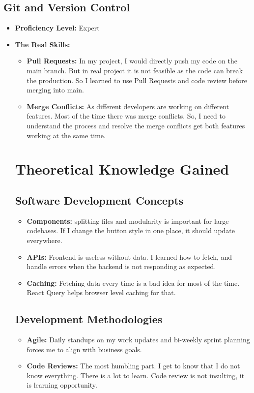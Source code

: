 \subsection{Git and Version Control}
\begin{itemize}
    \item \textbf{Proficiency Level:}  Expert
    \item \textbf{The Real Skills:}
    \begin{itemize}
        \item \textbf{Pull Requests:} In my project, I would directly push my code on the main branch. But in real project it is not feasible as the code can break the production. So I learned to use Pull Requests and code review before merging into main.
        \item \textbf{Merge Conflicts:} As different developers are working on different features. Most of the time there was merge conflicts. So, I need to understand the process and resolve the merge conflicts get both features working at the same time.
\end{itemize}


\section{Theoretical Knowledge Gained}

\subsection{Software Development Concepts}
\begin{itemize}
    \item \textbf{Components:} splitting files and modularity is important for large codebases. If I change the button style in one place, it should update everywhere.
    \item \textbf{APIs:} Frontend is useless without data. I learned how to fetch, and handle errors when the backend is not responding as expected.
    \item \textbf{Caching:} Fetching data every time is a bad idea for most of the time. React Query helps browser level caching for that.
\end{itemize}

\subsection{Development Methodologies}
\begin{itemize}
    \item \textbf{Agile:} Daily standups on my work updates and bi-weekly sprint planning forces me to align with business goals.
    \item \textbf{Code Reviews:} The most humbling part. I get to know that I do not know everything. There is a lot to learn. Code review is not insulting, it is learning opportunity.
\end{itemize}


\end{itemize}
